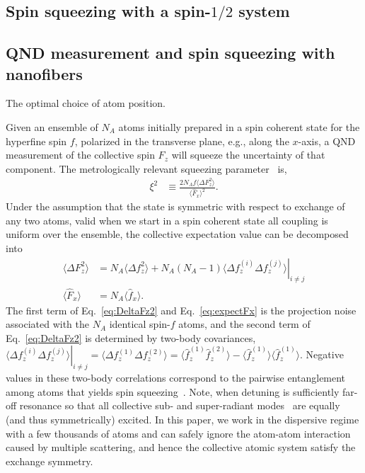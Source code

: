\documentclass[preprint,aps,pra,onecolumn,superscriptaddress]{revtex4-1} %
\newcommand{\expect}[1]{\big\langle #1 \big\rangle}
\begin{document}
\subsection{Spin squeezing with a spin-$1/2$ system} \label{Sec::squeezingwithspinhalfsystems}


\subsection{QND measurement and spin squeezing with nanofibers} \label{Sec::Nanofiber}

The optimal choice of atom position.

Given an ensemble of $N_A$ atoms initially prepared in a spin coherent state for the hyperfine spin $f$, polarized in the transverse plane, e.g., along the $x$-axis, a QND measurement of the collective spin  $F_z$ will squeeze the uncertainty of that component.  The metrologically relevant squeezing parameter~\cite{Wineland1992} is,
\begin{align}\label{eq:xi2Faraday}
\xi^2 &\equiv  \frac{2 N_A f \expect{\Delta F_z ^2}}{\expect{\hat{F}_x}^2}.
\end{align}
Under the assumption that the state is symmetric with respect to exchange of any two atoms, valid when we start in a spin coherent state all coupling is uniform over the ensemble, the collective expectation value can be decomposed into 
\begin{subequations}\label{eq:Ftof_squeezing}
\begin{align}
\expect{\Delta F_z^2} &= N_A \expect{\Delta f_z^2}+N_A(N_A-1)\left. \expect{\Delta f_z^{(i)}\Delta f_z^{(j)}}\right|_{i\neq j}\label{eq:DeltaFz2}\\
\expect{\hat{F}_x } & =N_A \expect{\hat{f}_x} \label{eq:expectFx}.
\end{align}
\end{subequations}
 The first term of Eq.~\eqref{eq:DeltaFz2} and Eq.~\eqref{eq:expectFx} is the projection noise associated with the  $N_A$ identical spin-$f$  atoms, and  the second term of Eq.~\eqref{eq:DeltaFz2} is determined by two-body covariances, $ \left.\expect{\Delta f_z^{(i)}\Delta f_z^{(j)}}\right|_{i\neq j}=\expect{\Delta f_z^{(1)}\Delta f_z^{(2)}} = \expect{\hat{f}_z^{(1)}\hat{f}_z^{(2)}}-\expect{\hat{f}_z^{(1)}} \expect{\hat{f}_z^{(1)}} $.  Negative values in these two-body correlations correspond to the pairwise entanglement among atoms that yields spin squeezing~\cite{Wang2003Spin}.  Note, when detuning is sufficiently far-off resonance so that all collective sub- and super-radiant modes~\cite{Asenjo-Garcia2017Atom,Asenjo-Garcia2017Exponential} are equally (and thus symmetrically) excited.  In this paper, we work in the dispersive regime with a few thousands of atoms and can safely ignore the atom-atom interaction caused by multiple scattering, and hence the collective atomic system satisfy the exchange symmetry. 
\end{document}
